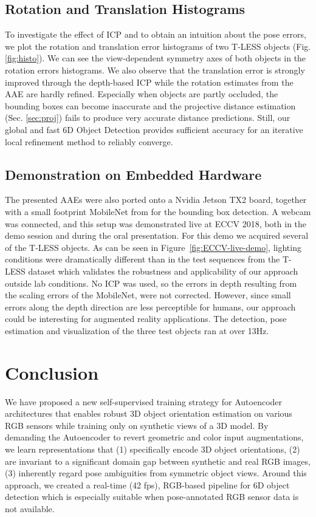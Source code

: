 {{	\subsection{Rotation and Translation Histograms}
	
	To investigate the effect of \gls{ICP} and to obtain an intuition about the pose errors, we plot the rotation and translation error histograms of two T-LESS objects (Fig. \ref{fig:histo}). We can see the view-dependent symmetry axes of both objects in the rotation errors histograms. We also observe that the translation error is strongly improved through the depth-based ICP while the rotation estimates from the \gls{AAE} are hardly refined. Especially when objects are partly occluded, the bounding boxes can become inaccurate and the projective distance estimation (Sec. \ref{sec:proj}) fails to produce very accurate distance predictions. Still, our global and fast 6D Object Detection provides sufficient accuracy for an iterative local refinement method to reliably converge.
	
	\subsection{Demonstration on Embedded Hardware}
	
	The presented \glspl{AAE} were also ported onto a Nvidia Jetson TX2 board, together with a small footprint MobileNet from \cite{howard2017mobilenets} for the bounding box detection. A webcam was connected, and this setup was demonstrated live at ECCV 2018, both in the demo session and during the oral presentation. For this demo we acquired several of the T-LESS objects. As can be seen in Figure~\ref{fig:ECCV-live-demo}, lighting conditions were dramatically different than in the test sequences from the T-LESS dataset which validates the robustness and applicability of our approach outside lab conditions. No ICP was used, so the errors in depth resulting from the scaling errors of the MobileNet, were not corrected. However, since small errors along the depth direction are less perceptible for humans, our approach could be interesting for augmented reality applications. The detection, pose estimation and visualization of the three test objects ran at over 13Hz.
	
	\section{Conclusion}
	We have proposed a new self-supervised training strategy for Autoencoder architectures that enables robust 3D object orientation estimation on various RGB sensors while training only on synthetic views of a 3D model. By demanding the Autoencoder to revert geometric and color input augmentations, we learn representations that (1) specifically encode 3D object orientations, (2) are invariant to a significant domain gap between synthetic and real RGB images, (3) inherently regard pose ambiguities from symmetric object views. Around this approach, we created a real-time (42 fps), RGB-based pipeline for 6D object detection which is especially suitable when pose-annotated RGB sensor data is not available.
	
}}
